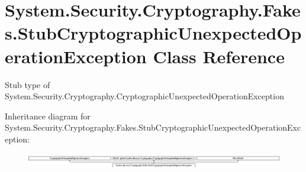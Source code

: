 \hypertarget{class_system_1_1_security_1_1_cryptography_1_1_fakes_1_1_stub_cryptographic_unexpected_operation_exception}{\section{System.\-Security.\-Cryptography.\-Fakes.\-Stub\-Cryptographic\-Unexpected\-Operation\-Exception Class Reference}
\label{class_system_1_1_security_1_1_cryptography_1_1_fakes_1_1_stub_cryptographic_unexpected_operation_exception}
}


Stub type of System.\-Security.\-Cryptography.\-Cryptographic\-Unexpected\-Operation\-Exception 


Inheritance diagram for System.\-Security.\-Cryptography.\-Fakes.\-Stub\-Cryptographic\-Unexpected\-Operation\-Exception\-:\begin{figure}[H]
\begin{center}
\leavevmode
\includegraphics[height=0.685015cm]{class_system_1_1_security_1_1_cryptography_1_1_fakes_1_1_stub_cryptographic_unexpected_operation_exception}
\end{center}
\end{figure}
